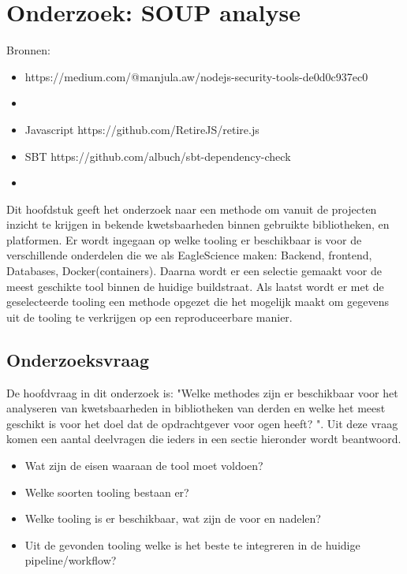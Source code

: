\chapter{Onderzoek: SOUP analyse}\label{ch:onderzoek:-soup-analyse} %
Bronnen:

\begin{itemize}
    \item https://medium.com/@manjula.aw/nodejs-security-tools-de0d0c937ec0
    \item
\end{itemize}
\begin{itemize}
    \item Javascript     https://github.com/RetireJS/retire.js
    \item SBT https://github.com/albuch/sbt-dependency-check
    \item
\end{itemize}

Dit hoofdstuk geeft het onderzoek naar een methode om vanuit de projecten inzicht te krijgen in bekende kwetsbaarheden binnen gebruikte bibliotheken, en platformen. Er wordt ingegaan op welke tooling er beschikbaar is voor de verschillende onderdelen die we als EagleScience maken: Backend, frontend, Databases, Docker(containers). Daarna wordt er een selectie gemaakt voor de meest geschikte tool binnen de huidige buildstraat. Als laatst wordt er met de geselecteerde tooling een methode opgezet die het mogelijk maakt om gegevens uit de tooling te verkrijgen op een reproduceerbare manier.

\section{Onderzoeksvraag}\label{sec:onderzoeksvraag}
De hoofdvraag in dit onderzoek is: "Welke methodes zijn er beschikbaar voor het analyseren van kwetsbaarheden in bibliotheken van derden en welke het meest geschikt is voor het doel dat de opdrachtgever voor ogen heeft? ". Uit deze vraag komen een aantal deelvragen die ieders in een sectie hieronder wordt beantwoord.
\begin{itemize}
    \item Wat zijn de eisen waaraan de tool moet voldoen?
    \item Welke soorten tooling bestaan er?
    \item Welke tooling is er beschikbaar, wat zijn de voor en nadelen?
    \item Uit de gevonden tooling welke is het beste te integreren in de huidige pipeline/workflow?
\end{itemize}

